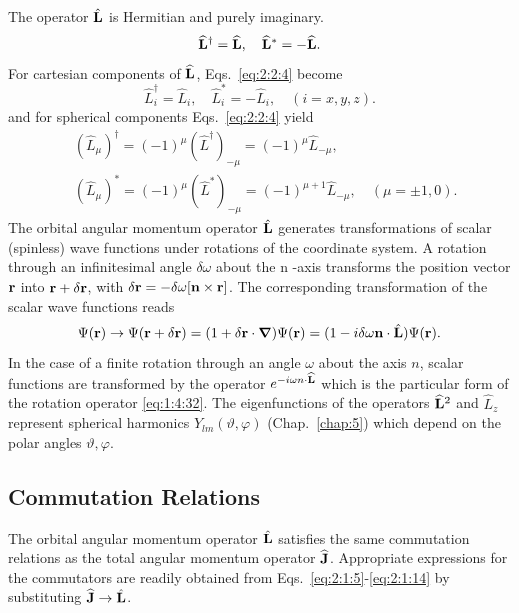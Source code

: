 The operator $\hat{\mathbf{L}}$ is Hermitian and purely imaginary.
\begin{equation}
\widehat{\mathbf{L}}^{\dagger}=\widehat{\mathbf{L}}, \quad \widehat{\mathbf{L}}^{*}=-\widehat{\mathbf{L}} . \label{eq:2:2:4}
\end{equation}
For cartesian components of $\widehat{\mathbf{L}}$, Eqs.~\eqref{eq:2:2:4} become
\begin{equation}
\widehat{L}_{i}^{\dagger}=\widehat{L}_{i}, \quad \widehat{L}_{i}^{*}=-\widehat{L}_{i}, \quad(i=x, y, z) . \label{eq:2:2:5}
\end{equation}
and for spherical components Eqs.~\eqref{eq:2:2:4} yield
\begin{equation}
\begin{aligned}
& \left(\widehat{L}_{\mu}\right)^{\dagger}=(-1)^{\mu}\left(\widehat{L}^{\dagger}\right)_{-\mu}=(-1)^{\mu} \widehat{L}_{-\mu}, \\
& \left(\widehat{L}_{\mu}\right)^{*}=(-1)^{\mu}\left(\widehat{L}^{*}\right)_{-\mu}=(-1)^{\mu+1} \widehat{L}_{-\mu}, \quad(\mu= \pm 1,0) .
\end{aligned}
\end{equation}
The orbital angular momentum operator $\hat{\mathbf{L}}$ generates transformations of scalar (spinless) wave functions under rotations of the coordinate system. A rotation through an infinitesimal angle $\delta \omega$ about the n -axis transforms the position vector $\mathbf{r}$ into $\mathbf{r}+\delta \mathbf{r}$, with $\delta \mathbf{r}=-\delta \omega[\mathbf{n} \times \mathbf{r}]$. The corresponding transformation of the scalar wave functions reads
\begin{equation}
\Psi(\mathbf{r}) \rightarrow \Psi(\mathbf{r}+\delta \mathbf{r})=(1+\delta \mathbf{r} \cdot \boldsymbol{\nabla}) \Psi(\mathbf{r})=(1-i \delta \omega \mathbf{n} \cdot \hat{\mathbf{L}}) \Psi(\mathbf{r}) . \label{eq:2:2:7}
\end{equation}
In the case of a finite rotation through an angle $\omega$ about the axis $n$, scalar functions are transformed by the operator $e^{-i \omega n \cdot \widehat{\mathbf{L}}}$ which is the particular form of the rotation operator \ref{eq:1:4:32}. The eigenfunctions of the operators $\widehat{\mathbf{L}}^{2}$ and $\widehat{L}_{z}$ represent spherical harmonics $Y_{l m}(\vartheta, \varphi)$ (Chap.~\ref{chap:5}) which depend on the polar angles $\vartheta, \varphi$.

\subsection{Commutation Relations}
The orbital angular momentum operator $\hat{\mathbf{L}}$ satisfies the same commutation relations as the total angular momentum operator $\widehat{\mathbf{J}}$. Appropriate expressions for the commutators are readily obtained from Eqs.~\eqref{eq:2:1:5}-\eqref{eq:2:1:14} by substituting $\widehat{\mathbf{J}} \rightarrow \hat{\mathbf{L}}$.

